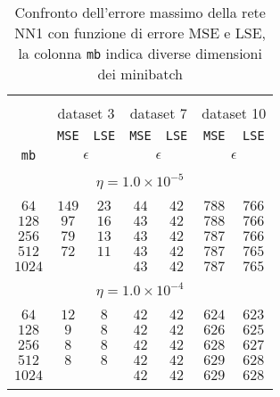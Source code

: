 \vspace*{\fill}
\begin{center}

\begin{table}[]
  \small
  
\begin{center}
\caption{Confronto dell'errore massimo della rete NN1 con funzione di errore MSE e LSE, la colonna \texttt{mb} indica diverse dimensioni dei minibatch}\label{tab:lse1}
\begin{tabular}{@{}c||cc|cc|cc@{}}

\hline\\[-11pt]
\hline\\[-6.5pt]
&\multicolumn{2}{c}{dataset 3} & \multicolumn{2}{c}{dataset 7} & \multicolumn{2}{c}{dataset 10}\\[5pt]
& \texttt{MSE} & \texttt{LSE} & \texttt{MSE} & \texttt{LSE} & \texttt{MSE} & \texttt{LSE} \\[1pt]
\texttt{mb} & \multicolumn{2}{c}{\bf $\epsilon$} & \multicolumn{2}{c}{\bf $\epsilon$} & \multicolumn{2}{c}{\bf $\epsilon$} \\[1pt]
\hline\\[-11pt]
\multicolumn{7}{c}{$\eta = 1.0\times 10^{-5}$} \\[5pt]
\hline\\[-11pt]
$64$ & $149$ & $23$ & $44$  & $42$ & $788$   & $766$  \\[1pt] 
$128$ & $97$ & $16$ & $43$  & $42$ & $788$   & $766$  \\[1pt] 
$256$ & $79$ & $13$ & $43$  & $42$ & $787$   & $766$  \\[1pt] 
$512$ & $72$ & $11$ & $43$  & $42$ & $787$   & $765$  \\[1pt]
$1024$&      &      & $43$  & $42$ & $787$   & $765$  \\[1pt]
\hline\\[-11pt]
\multicolumn{7}{c}{$\eta = 1.0\times 10^{-4}$} \\[5pt]
\hline\\[-11pt]
$64$ & $12$ & $8$ & $42$   & $42$ & $624$  & $623$ \\ [1pt]
$128$ & $9$ & $8$ & $42$   & $42$ & $626$  & $625$ \\ [1pt]
$256$ & $8$ & $8$ & $42$   & $42$ & $628$  & $627$ \\ [1pt]
$512$ & $8$ & $8$ & $42$   & $42$ & $629$  & $628$ \\ [1pt]
$1024$&     &     & $42$   & $42$ & $629$  & $628$ \\ [1pt]
\hline\\[-11pt]

\end{tabular}
\end{center}
\end{table}
\end{center}
